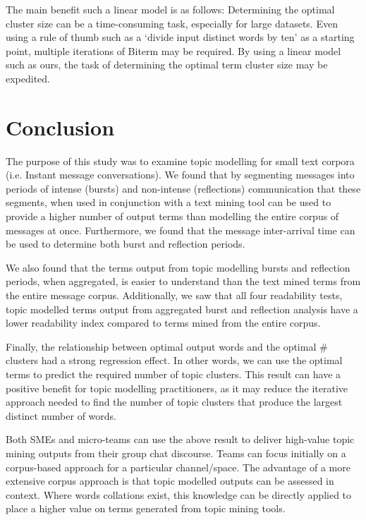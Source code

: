 The main benefit such a linear model is as follows: Determining the optimal cluster size can be a time-consuming task, especially for large datasets. Even using a rule of thumb such as a `divide input distinct words by ten' as a starting point, multiple iterations of Biterm may be required. By using a linear model such as ours, the task of determining the optimal term cluster size may be expedited. 




\section{Conclusion}
The purpose of this study was to examine topic modelling for small text corpora (i.e. Instant message conversations). We found that by segmenting messages into periods of intense (bursts) and non-intense (reflections) communication that these segments, when used in conjunction with a text mining tool can be used to provide a higher number of output terms than modelling the entire corpus of messages at once. Furthermore, we found that the message inter-arrival time can be used to determine both burst and reflection periods.

We also found that the terms output from topic modelling bursts and reflection periods, when aggregated, is easier to understand than the text mined terms from the entire message corpus. Additionally, we saw that all four readability tests, topic modelled terms output from aggregated burst and reflection analysis have a lower readability index compared to terms mined from the entire corpus.

Finally, the relationship between optimal output words and the optimal \# clusters had a strong regression effect. In other words, we can use the optimal terms to predict the required number of topic clusters. This result can have a positive benefit for topic modelling practitioners, as it may reduce the iterative approach needed to find the number of topic clusters that produce the largest distinct number of words.

Both SMEs and micro-teams can use the above result to deliver high-value topic mining outputs from their group chat discourse. Teams can focus initially on a corpus-based approach for a particular channel/space. The advantage of a more extensive corpus approach is that topic modelled outputs can be assessed in context. Where words collations exist, this knowledge can be directly applied to place a higher value on terms generated from topic mining tools.

